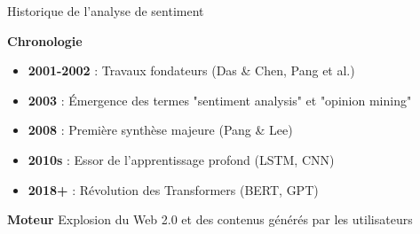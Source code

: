 \begin{frame}{Historique de l'analyse de sentiment}
    \begin{block}{\centering \textbf{Chronologie}}
        \begin{itemize}
            \setlength\itemsep{0.5em}
            \item \textbf{2001-2002} : Travaux fondateurs (Das \& Chen, Pang et al.)
            \item \textbf{2003} : Émergence des termes "sentiment analysis" et "opinion mining"
            \item \textbf{2008} : Première synthèse majeure (Pang \& Lee)
            \item \textbf{2010s} : Essor de l'apprentissage profond (LSTM, CNN)
            \item \textbf{2018+} : Révolution des Transformers (BERT, GPT)
        \end{itemize}
    \end{block}
    
    \vspace{0.3cm}
    
    \begin{alertblock}{\centering \textbf{Moteur}}
        \centering
        Explosion du Web 2.0 et des contenus générés par les utilisateurs
    \end{alertblock}
\end{frame}

